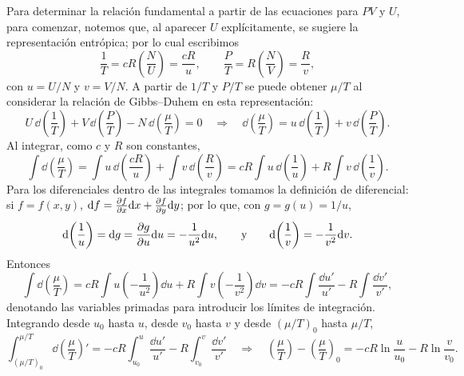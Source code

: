 Para determinar la relación fundamental a partir de las ecuaciones para $PV$ y $U$, para comenzar,
notemos que, al aparecer $U$ explícitamente, se sugiere la representación entrópica; por lo cual
escribimos
\begin{equation*}
  \frac{1}{T}=cR\left(\frac{N}{U}\right)=\frac{cR}{u},\qquad
  \frac{P}{T}=R\left(\frac{N}{V}\right)=\frac{R}{v},
\end{equation*}
con $u=U/N$ y $v=V/N$. A partir de $1/T$ y $P/T$ se puede obtener $\mu/T$ al considerar la relación
de Gibbs--Duhem en esta representación:
\begin{equation*}
  U\,\dd\!\left(\frac{1}{T}\right)+V\,\dd\!\left(\frac{P}{T}\right)-N\,\dd\!\left(\frac{\mu}{T}\right)=0
  \quad\Longrightarrow\quad
  \dd\!\left(\frac{\mu}{T}\right)=u\,\dd\!\left(\frac{1}{T}\right)+v\,\dd\!\left(\frac{P}{T}\right).
\end{equation*}
Al integrar, como $c$ y $R$ son constantes,
\begin{equation*}
  \int\dd\!\left(\frac{\mu}{T}\right)=\int u\,\dd\!\left(\frac{cR}{u}\right)+\int v\,\dd\!\left(\frac{R}{v}\right)
  =cR\int u\,\dd\!\left(\frac{1}{u}\right)+R\int v\,\dd\!\left(\frac{1}{v}\right).
\end{equation*}
Para los diferenciales dentro de las integrales tomamos la definición de diferencial: si
$f=f(x,y)$, $\dd f=\pdv{f}{x}\dd x+\pdv{f}{y}\dd y$; por lo que, con $g=g(u)=1/u$,
\begin{equation*}
  \dd\!\left(\frac{1}{u}\right)=\dd g=\pdv{g}{u}\dd u=-\frac{1}{u^{2}}\dd u,
  \qquad\text{y}\qquad
  \dd\!\left(\frac{1}{v}\right)=-\frac{1}{v^{2}}\dd v.
\end{equation*}
Entonces
\begin{equation*}
  \int\dd\!\left(\frac{\mu}{T}\right)=cR\int u\left(-\frac{1}{u^{2}}\right)\dd u+R\int v\left(-\frac{1}{v^{2}}\right)\dd v
  =-cR\int\frac{\dd u'}{u'}-R\int\frac{\dd v'}{v'},
\end{equation*}
denotando las variables primadas para introducir los límites de integración. Integrando desde $u_0$
hasta $u$, desde $v_0$ hasta $v$ y desde $(\mu/T)_0$ hasta $\mu/T$,
\begin{equation*}
  \int_{(\mu/T)_0}^{\mu/T}\dd\!\left(\frac{\mu}{T}\right)'=-cR\int_{u_0}^{u}\frac{\dd u'}{u'}-R\int_{v_0}^{v}\frac{\dd v'}{v'}
  \quad\Longrightarrow\quad
  \left(\frac{\mu}{T}\right)-\left(\frac{\mu}{T}\right)_0=-cR\ln\frac{u}{u_0}-R\ln\frac{v}{v_0}.
\end{equation*}

